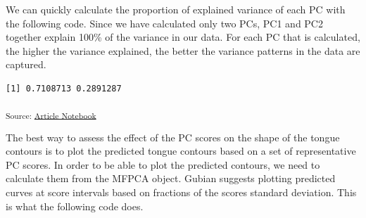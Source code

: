 \documentclass[
  man,
  longtable,
  nolmodern,
  notxfonts,
  notimes,
  colorlinks=true,linkcolor=blue,citecolor=blue,urlcolor=blue]{apa7}
\newenvironment{Shaded}{\begin{snugshade}}{\end{snugshade}}
\newcommand{\CommentTok}[1]{\textcolor[rgb]{0.37,0.37,0.37}{#1}}
\newcommand{\FunctionTok}[1]{\textcolor[rgb]{0.28,0.35,0.67}{#1}}
\newcommand{\NormalTok}[1]{\textcolor[rgb]{0.00,0.23,0.31}{#1}}
\newcommand{\SpecialCharTok}[1]{\textcolor[rgb]{0.37,0.37,0.37}{#1}}
\begin{document}
We can quickly calculate the proportion of explained variance of each PC
with the following code. Since we have calculated only two PCs, PC1 and
PC2 together explain 100\% of the variance in our data. For each PC that
is calculated, the higher the variance explained, the better the
variance patterns in the data are captured.

\begin{Shaded}
\end{Shaded}

\begin{verbatim}
[1] 0.7108713 0.2891287
\end{verbatim}

\textsubscript{Source:
\href{https://stefanocoretta.github.io/mv_uti/index.qmd.html}{Article
Notebook}}

The best way to assess the effect of the PC scores on the shape of the
tongue contours is to plot the predicted tongue contours based on a set
of representative PC scores. In order to be able to plot the predicted
contours, we need to calculate them from the MFPCA object. Gubian
suggests plotting predicted curves at score intervals based on fractions
of the scores standard deviation. This is what the following code does.
\end{document}
